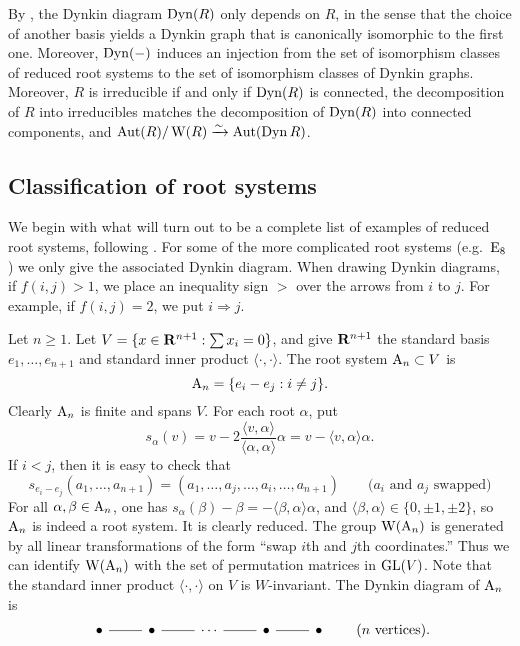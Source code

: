 By \cite[VI \S 4.2]{bourbaki-lie-alg-4-6}, the Dynkin diagram $\operatorname{Dyn}(R)$ 
only depends on $R$, in the sense that the choice of another basis yields a 
Dynkin graph that is canonically isomorphic to the first one. Moreover, 
$\operatorname{Dyn}(-)$ induces an injection from the set of isomorphism classes of 
reduced root systems to the set of isomorphism classes of Dynkin graphs. 
Moreover, $R$ is irreducible if and only if $\operatorname{Dyn}(R)$ is connected, the 
decomposition of $R$ into irreducibles matches the decomposition of 
$\operatorname{Dyn}(R)$ into connected components, and 
$\operatorname{Aut}(R)/\operatorname{W}(R)\xrightarrow\sim \operatorname{Aut}(\operatorname{Dyn} R)$. 





\subsection{Classification of root systems}\label{sec:root-classify}

We begin with what will turn out to be a complete list of examples of reduced 
root systems, following \cite[VI \S4]{bourbaki-lie-alg-4-6}. For some of the 
more complicated root systems (e.g.~$\mathrm{E}_8$) we only give the associated 
Dynkin diagram. When drawing Dynkin diagrams, if $f(i,j)>1$, we place an 
inequality sign $>$ over the arrows from $i$ to $j$. For example, if 
$f(i,j)=2$, we put $i\Rightarrow j$. 


\begin{example}
Let $n\geqslant 1$. Let $V=\{x\in \mathbf{R}^{n+1}:\sum x_i=0\}$, and give $\mathbf{R}^{n+1}$ 
the standard basis $e_1,\dots,e_{n+1}$ and standard inner product 
$\langle\cdot,\cdot\rangle$. The root system $\mathrm{A}_n\subset V$ is 
\[
  \mathrm{A}_n=\{e_i-e_j:i\ne j\} .
\]
Clearly $\mathrm{A}_n$ is finite and spans $V$. For each root $\alpha$, put 
\[
  s_\alpha(v) = v-2\frac{\langle v,\alpha\rangle}{\langle \alpha,\alpha\rangle} \alpha  = v-\langle v,\alpha\rangle \alpha .
\]
If $i<j$, then it is easy to check that 
\[
  s_{e_i-e_j}(a_1,\dots,a_{n+1}) = (a_1,\dots,a_j,\dots,a_i,\dots,a_{n+1}) \qquad \text{($a_i$ and $a_j$ swapped)}
\]
For all $\alpha,\beta\in \mathrm{A}_n$, one has 
$s_\alpha(\beta)-\beta=-\langle \beta,\alpha\rangle\alpha$, and 
$\langle \beta,\alpha\rangle\in \{0,\pm 1,\pm 2\}$, so $\mathrm{A}_n$ is indeed 
a root system. It is clearly reduced. The group $\operatorname{W}(\mathrm{A}_n)$ is generated 
by all linear transformations of the form ``swap $i$th and $j$th coordinates.'' 
Thus we can identify $\operatorname{W}(\mathrm{A}_n)$ with the set of permutation matrices 
in $\operatorname{GL}(V)$. Note that the standard inner product $\langle\cdot,\cdot\rangle$ 
on $V$ is $W$-invariant. The Dynkin diagram of $\mathrm{A}_n$ is 
\[
\begin{tikzcd}
  \bullet \ar[r, dash] 
    & \bullet \ar[r, dash] 
    & \cdots \ar[r, dash] 
    & \bullet \ar[r, dash] 
    & \bullet
\end{tikzcd}
\qquad\text{($n$ vertices)} .
\]
\end{example}

